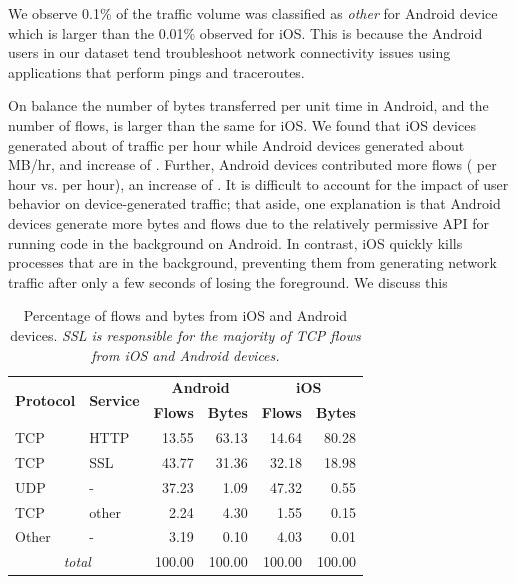 We observe 0.1\% of the traffic volume was classified as \emph{other} for Android device which is larger than the 0.01\% observed for iOS. 
This is because the Android users in our dataset tend troubleshoot network connectivity issues using applications that perform pings and traceroutes. 

On balance the number of bytes transferred per unit time in Android, and the number of flows, is larger than the same for iOS. 
We found that iOS devices generated about  of traffic per hour while Android devices generated about MB/hr, and increase of .
Further, Android devices contributed more flows ( per hour vs.  per hour), an  increase of . 
It is difficult to account for the impact of   user behavior on device-generated traffic; that aside, one explanation is that Android devices generate more bytes and flows due to the relatively permissive API for running code in the background on Android. 
In contrast, iOS quickly kills processes that are in the background, preventing them from  generating network traffic after only a few seconds of losing the foreground. 
We discuss this 


\begin{table}
\begin{center}
\begin{small}
\begin{tabular}{|l|l|r|r|r|r|}
\hline
\multirow{2}{*}{\bf Protocol} & \multirow{2}{*}{\bf Service} & \multicolumn{2}{|c|}{\bf Android} & \multicolumn{2}{|c|}{\bf iOS} \tabularnewline
\cline{3-6}
           &           &  \textbf{Flows}  &  \textbf{Bytes}  &  \textbf{Flows}  &  \textbf{Bytes}  \tabularnewline
\hline
 TCP       &  HTTP     &  13.55  &  63.13  &  14.64  &  80.28  \tabularnewline
\hline
TCP       &  SSL      &  43.77  &  31.36  &  32.18  &  18.98  \tabularnewline
\hline
 UDP       &  -        &  37.23  &   1.09  &  47.32  &   0.55  \tabularnewline
\hline
 TCP       &  other    &   2.24  &   4.30  &   1.55  &   0.15  \tabularnewline
\hline
 Other     &  -        &   3.19  &   0.10  &   4.03  &   0.01  \tabularnewline
\hline
\multicolumn{2}{|c|}{\emph{total}} & 100.00 & 100.00 & 100.00 & 100.00 \tabularnewline
\hline
\end{tabular}
\end{small}
\end{center}
\caption{Percentage of flows and bytes from iOS and Android devices.
 \emph{SSL is responsible for the
majority of TCP flows from iOS and Android devices.}}
\label{tab:summaryIOSAndroidTraffic}
\end{table}

